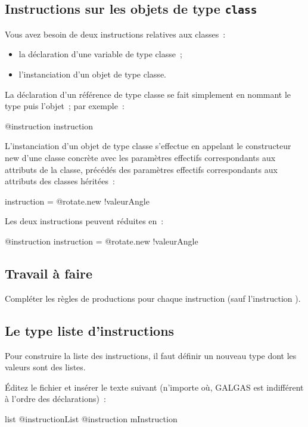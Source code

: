 \subsection{Instructions sur les objets de type \texttt{class}}

Vous avez besoin de deux instructions relatives aux classes~:
\begin{itemize}
  \item la déclaration d'une variable de type classe~;
  \item l'instanciation d'un objet de type classe.
\end{itemize}

La déclaration d'un référence de type classe se fait simplement en nommant le type puis l'objet~; par exemple~:
\begin{galgas3}
@instruction instruction
\end{galgas3}

L'instanciation d'un objet de type classe s'effectue en appelant le constructeur new d'une classe concrète avec les paramètres effectifs correspondants aux attributs de la classe, précédés des paramètres effectifs correspondants aux attributs des classes héritées~:
\begin{galgas3}
instruction = @rotate.new {!valeurAngle}
\end{galgas3}

Les deux instructions peuvent réduites en~:
\begin{galgas3}
@instruction instruction = @rotate.new {!valeurAngle}
\end{galgas3}

\subsection{Travail à faire}
Compléter les règles de productions pour chaque instruction (sauf l'instruction ).

\subsection{Le type liste d'instructions}
Pour construire la liste des instructions, il faut définir un nouveau type dont les valeurs sont des listes.

Éditez le fichier  et insérer le texte suivant (n’importe où, GALGAS est indifférent à l’ordre des déclarations)~:

\begin{galgas3}
list @instructionList {
  @instruction mInstruction
}
\end{galgas3}

